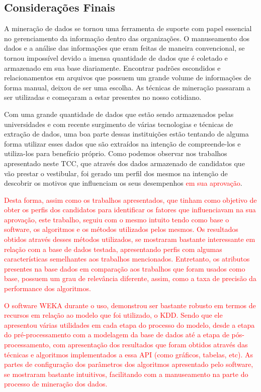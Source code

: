 \label{chapter:consideracoes}

\subsection{Considerações Finais}

\par 
A mineração de dados se tornou uma ferramenta de suporte com papel essencial no gerenciamento da informação dentro das organizações. O manuseamento dos dados e a análise das informações que eram feitas de maneira convencional, se tornou impossível devido a imensa quantidade de dados que é coletado e armazenado em sua base diariamente. Encontrar padrões escondidos e relacionamentos em arquivos que possuem um grande volume de informações de forma manual, deixou de ser uma escolha. As técnicas de mineração passaram a ser utilizadas e começaram a estar presentes no nosso cotidiano.

\par
Com uma grande quantidade de dados que estão sendo armazenados pelas universidades e com recente surgimento de várias tecnologias e técnicas de extração de dados, uma boa parte dessas instituições estão tentando de alguma forma utilizar esses dados que são extraídos  na intenção de compreende-los e utiliza-los para benefício próprio. Como podemos observar nos trabalhos apresentado neste TCC, que através dos dados armazenado de candidatos que vão prestar o vestibular, foi gerado um perfil dos mesmos na intenção de descobrir os motivos que influenciam os seus desempenhos \textcolor{red}{em sua aprovação}.

\par
\textcolor{red}{Desta forma, assim como os trabalhos apresentados, que tinham como objetivo de obter os perfis dos candidatos para identificar os fatores que influenciavam na sua aprovação, este trabalho, seguiu com o mesmo intuito tendo como base o software, os algoritmos e os métodos utilizados pelos mesmos. Os resultados obtidos através desses métodos utilizados, se mostraram bastante interessante em relação com a base de dados testada, apresentando perfis com algumas características semelhantes aos trabalhos mencionados. Entretanto, os atributos presentes na base dados em comparação aos trabalhos que foram usados como base, possuem um grau de relevância diferente, assim, como a taxa de precisão da performance dos algoritmos.}

\par
\textcolor{red}{
O software WEKA durante o uso, demonstrou ser bastante robusto em termos de recursos em relação ao modelo que foi utilizado, o KDD. Sendo que ele apresentou várias utilidades em cada etapa do processo do modelo, desde a etapa do pré-processamento com a modelagem da base de dados até a etapa de pós-processamento, com apresentação dos resultados que foram obtidos através das técnicas e algoritmos implementados a essa API (como gráficos, tabelas, etc). As partes de configuração dos parâmetros dos algoritmos apresentado pelo software, se mostraram bastante intuitivos, facilitando com a manuseamento na parte do processo de mineração dos dados.}

